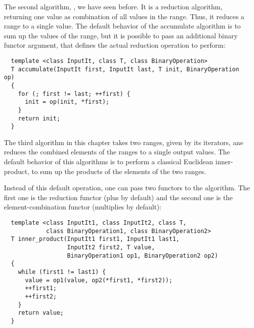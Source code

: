 The second algorithm, , we have seen before. It is a reduction algorithm, returning one value as combination of all values in the range.
Thus, it reduces a range to a single value. The default behavior of the accumulate algorithm is to sum up the values of the range, but it is possible to
pass an additional binary functor argument, that defines the actual reduction operation to perform:
%
\begin{samepage}
\begin{verbatim}
  template <class InputIt, class T, class BinaryOperation>
  T accumulate(InputIt first, InputIt last, T init, BinaryOperation op)
  {
    for (; first != last; ++first) {
      init = op(init, *first);
    }
    return init;
  }
\end{verbatim}
\end{samepage}

The third algorithm in this chapter takes two ranges, given by its iterators, ane reduces the combined elements of the ranges to a single output values.
The default behavior of this algorithms is to perform a classical Euclidean inner-product, \ie to sum up the products of the elements of the two ranges.

Instead of this default operation, one can pass two functors to the algorithm. The first one is the reduction functor (plus by default) and the second one
is the element-combination functor (multiplies by default):
%
\begin{samepage}
\begin{verbatim}
  template <class InputIt1, class InputIt2, class T,
            class BinaryOperation1, class BinaryOperation2>
  T inner_product(InputIt1 first1, InputIt1 last1,
                  InputIt2 first2, T value,
                  BinaryOperation1 op1, BinaryOperation2 op2)
  {
    while (first1 != last1) {
      value = op1(value, op2(*first1, *first2));
      ++first1;
      ++first2;
    }
    return value;
  }
\end{verbatim}
\end{samepage}

